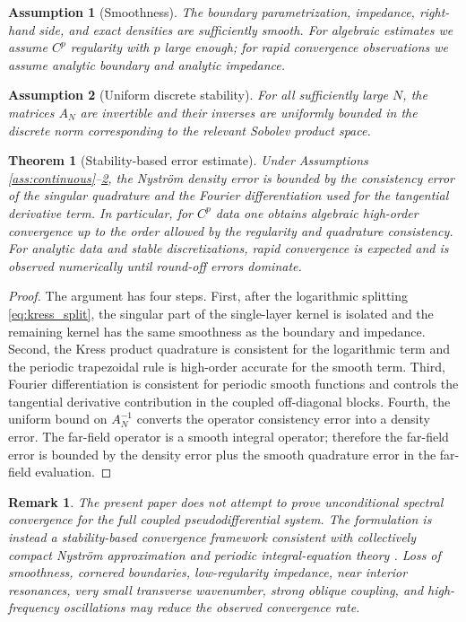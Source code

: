 \documentclass[11pt]{article}
\numberwithin{equation}{section}
\newtheorem{theorem}{Theorem}[section]
\newtheorem{assumption}{Assumption}[section]
\newtheorem{remark}{Remark}[section]
\begin{document}
\begin{assumption}[Smoothness]\label{ass:smoothness}
The boundary parametrization, impedance, right-hand side, and exact densities are sufficiently smooth. For algebraic estimates we assume $C^p$ regularity with $p$ large enough; for rapid convergence observations we assume analytic boundary and analytic impedance.
\end{assumption}

\begin{assumption}[Uniform discrete stability]\label{ass:stability}
For all sufficiently large $N$, the matrices $A_N$ are invertible and their inverses are uniformly bounded in the discrete norm corresponding to the relevant Sobolev product space.
\end{assumption}

\begin{theorem}[Stability-based error estimate]
Under Assumptions \ref{ass:continuous}--\ref{ass:stability}, the Nystr\"om density error is bounded by the consistency error of the singular quadrature and the Fourier differentiation used for the tangential derivative term. In particular, for $C^p$ data one obtains algebraic high-order convergence up to the order allowed by the regularity and quadrature consistency. For analytic data and stable discretizations, rapid convergence is expected and is observed numerically until round-off errors dominate.
\end{theorem}

\begin{proof}
The argument has four steps. First, after the logarithmic splitting \eqref{eq:kress_split}, the singular part of the single-layer kernel is isolated and the remaining kernel has the same smoothness as the boundary and impedance. Second, the Kress product quadrature is consistent for the logarithmic term and the periodic trapezoidal rule is high-order accurate for the smooth term. Third, Fourier differentiation is consistent for periodic smooth functions and controls the tangential derivative contribution in the coupled off-diagonal blocks. Fourth, the uniform bound on $A_N^{-1}$ converts the operator consistency error into a density error. The far-field operator is a smooth integral operator; therefore the far-field error is bounded by the density error plus the smooth quadrature error in the far-field evaluation.
\end{proof}

\begin{remark}
The present paper does not attempt to prove unconditional spectral convergence for the full coupled pseudodifferential system. The formulation is instead a stability-based convergence framework consistent with collectively compact Nystr\"om approximation and periodic integral-equation theory \cite{atkinson1997,kress2014,saranen2002}. Loss of smoothness, cornered boundaries, low-regularity impedance, near interior resonances, very small transverse wavenumber, strong oblique coupling, and high-frequency oscillations may reduce the observed convergence rate.
\end{remark}
\end{document}

